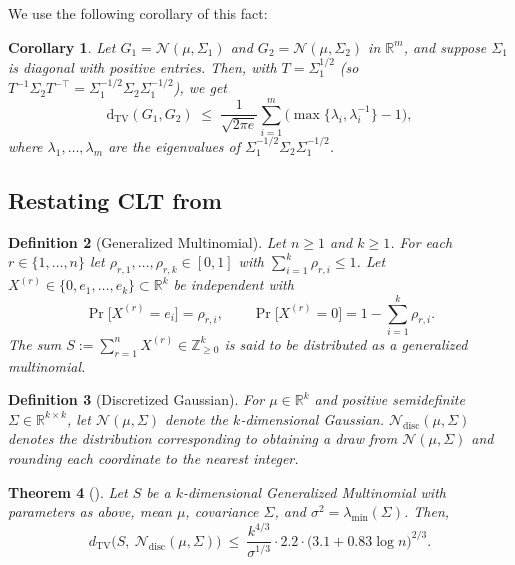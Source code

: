 \documentclass[10pt]{article} %
\theoremstyle{plain}
\newtheorem{theorem}{Theorem}
\newtheorem{corollary}[theorem]{Corollary}
\newtheorem{definition}[theorem]{Definition}
\begin{document}
We use the following corollary of this fact:
\begin{corollary}
\label{cor:multivariate_gaussian_tv_same_mean_diag_cov}
Let $G_1=\mathcal{N}(\mu,\Sigma_1)$ and $G_2=\mathcal{N}(\mu,\Sigma_2)$ in $\mathbb{R}^m$, and suppose $\Sigma_1$ is diagonal with positive entries.
Then, with $T=\Sigma_1^{1/2}$ (so $T^{-1}\Sigma_2 T^{-\top}=\Sigma_1^{-1/2}\Sigma_2\Sigma_1^{-1/2}$), we get
\[
\mathrm{d}_{\mathrm{TV}}(G_1,G_2)
\;\le\; \frac{1}{\sqrt{2\pi e}}\sum_{i=1}^m\Big(\max\{\lambda_i,\lambda_i^{-1}\}-1\Big),
\]
where $\lambda_1,\ldots,\lambda_m$ are the eigenvalues of $\Sigma_1^{-1/2}\Sigma_2\Sigma_1^{-1/2}$.
\end{corollary}

\subsection{Restating CLT from \citet{valiant2011estimating}}
\label{sec:valiant-valiant-clt-restated}

\begin{definition}[Generalized Multinomial]
Let $n\ge 1$ and $k\ge 1$. For each $r\in\{1,\dots,n\}$ let
$\rho_{r,1},\dots,\rho_{r,k}\in[0,1]$ with $\sum_{i=1}^k \rho_{r,i}\le 1$.
Let $X^{(r)}\in\{0,e_1,\dots,e_k\}\subset\mathbb{R}^k$ be independent with
\[
\Pr\!\big[X^{(r)}=e_i\big]=\rho_{r,i},\qquad
\Pr\!\big[X^{(r)}=0\big]=1-\sum_{i=1}^k\rho_{r,i}.
\]
The sum $S:=\sum_{r=1}^n X^{(r)}\in\mathbb{Z}_{\ge 0}^k$ is said to be distributed as a generalized multinomial.
\end{definition}

\begin{definition}[Discretized Gaussian]
For $\mu\in\mathbb{R}^k$ and positive semidefinite $\Sigma\in\mathbb{R}^{k\times k}$,
let $\mathcal{N}(\mu,\Sigma)$ denote the $k$-dimensional Gaussian.
$\mathcal{N}_{\mathrm{disc}}(\mu,\Sigma)$ denotes the distribution corresponding to obtaining a draw from 
$\mathcal{N}(\mu,\Sigma)$ and rounding each coordinate to the nearest
integer.
\end{definition}

\begin{theorem}[{\citet[Thm.~4]{valiant2011estimating}}]
\label{thm:vv-clt}
Let $S$ be a $k$-dimensional Generalized Multinomial with parameters as above, mean $\mu$,
covariance $\Sigma$, and $\sigma^2=\lambda_{\min}(\Sigma)$.
Then,
\[
d_{\mathrm{TV}}\!\big(S,\ \mathcal{N}_{\mathrm{disc}}(\mu,\Sigma)\big)
\ \le\ \frac{k^{4/3}}{\sigma^{1/3}}\cdot 2.2\cdot\big(3.1+0.83\log n\big)^{2/3}.
\]
\end{theorem}
\end{document}
